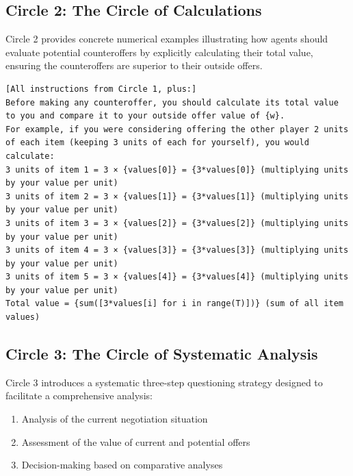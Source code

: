 \subsection{Circle 2: The Circle of Calculations}
Circle 2 provides concrete numerical examples illustrating how agents should evaluate potential counteroffers by explicitly calculating their total value, ensuring the counteroffers are superior to their outside offers.

\begin{Verbatim}[breaklines,fontsize=\small]
[All instructions from Circle 1, plus:]
Before making any counteroffer, you should calculate its total value to you and compare it to your outside offer value of {w}. 
For example, if you were considering offering the other player 2 units of each item (keeping 3 units of each for yourself), you would calculate:
3 units of item 1 = 3 × {values[0]} = {3*values[0]} (multiplying units by your value per unit)
3 units of item 2 = 3 × {values[1]} = {3*values[1]} (multiplying units by your value per unit)
3 units of item 3 = 3 × {values[2]} = {3*values[2]} (multiplying units by your value per unit)
3 units of item 4 = 3 × {values[3]} = {3*values[3]} (multiplying units by your value per unit)
3 units of item 5 = 3 × {values[4]} = {3*values[4]} (multiplying units by your value per unit)
Total value = {sum([3*values[i] for i in range(T)])} (sum of all item values)
\end{Verbatim}

\subsection{Circle 3: The Circle of Systematic Analysis}
Circle 3 introduces a systematic three-step questioning strategy designed to facilitate a comprehensive analysis:
\begin{enumerate}
\item Analysis of the current negotiation situation
\item Assessment of the value of current and potential offers
\item Decision-making based on comparative analyses
\end{enumerate}

